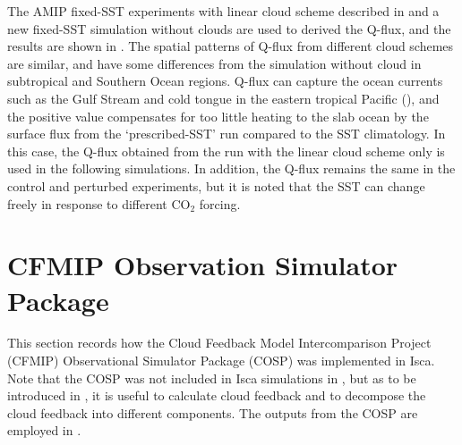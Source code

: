 The AMIP fixed-SST experiments with linear cloud scheme described in  and a new fixed-SST simulation without clouds are used to derived the Q-flux, and the results are shown in . The spatial patterns of Q-flux from different cloud schemes are similar, and have some differences from the simulation without cloud in subtropical and Southern Ocean regions. Q-flux can capture the ocean currents such as the Gulf Stream and cold tongue in the eastern tropical Pacific (), and the positive value compensates for too little heating to the slab ocean by the surface flux from the `prescribed-SST’ run compared to the SST climatology. In this case, the Q-flux obtained from the run with the linear cloud scheme only is used in the following simulations. In addition, the Q-flux remains the same in the control and perturbed experiments, but it is noted that the SST can change freely in response to different CO$_2$ forcing. 


\section{CFMIP Observation Simulator Package}
\label{sec:cosp}

This section records how the Cloud Feedback Model Intercomparison Project (CFMIP) Observational Simulator Package (COSP) was implemented in Isca. Note that the COSP was not included in Isca simulations in , but as to be introduced in , it is useful to calculate cloud feedback and to decompose the cloud feedback into different components. The outputs from the COSP are employed in . 

